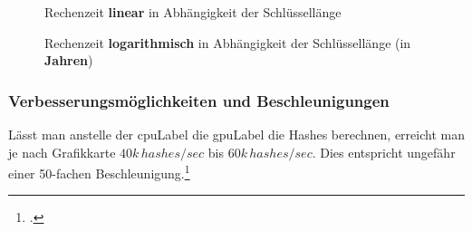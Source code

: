 \begin{figure}[H]
	\begin{minipage}[b]{.45\linewidth}
	   	\pgfplotsset{width=1.0\textwidth, height=0.7\textwidth}
		\centering
		\label{fig:1a}
	\end{minipage}%
	\begin{minipage}[b]{.45\linewidth}
		\pgfplotsset{width=1.0\textwidth, height=0.7\textwidth}
		\centering
		\label{fig:1b}
	\end{minipage}
	\caption[Rechenzeit linear in Abhängigkeit der Schlüssellänge]{Rechenzeit \textbf{linear} in Abhängigkeit der Schlüssellänge}\label{fig:1}
	\label{fig:wpa_attack_linear}
\end{figure}

\begin{figure}[H]
	\begin{minipage}[b]{.65\linewidth}
		\pgfplotsset{width=1.0\textwidth, height=0.7\textwidth}
		\centering
	\end{minipage}
	\caption[Rechenzeit logarithmisch in Abhängigkeit der Schlüssellänge]{Rechenzeit \textbf{logarithmisch} in Abhängigkeit der Schlüssellänge (in \textbf{Jahren})}\label{fig:}
	\label{fig:wpa_attack_log}
\end{figure}


\subsubsection{Verbesserungsmöglichkeiten und Beschleunigungen}
Lässt man anstelle der \gls{cpuLabel} die \gls{gpuLabel} die Hashes berechnen, erreicht man je nach Grafikkarte $40k\,hashes/sec$ bis $60k\,hashes/sec$. Dies entspricht ungefähr einer 50-fachen Beschleunigung.\footcite[][158]{WrightCache201503}

